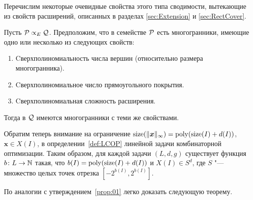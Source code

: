Перечислим некоторые очевидные свойства этого типа сводимости,
вытекающие из свойств расширений, описанных в разделах \ref{sec:Extension} и \ref{sec:RectCover}. 

	
\begin{prop}
	\label{thm:PropE}
	Пусть ${\mathcal P} \propto_E {\mathcal Q}$.
	Предположим, что в семействе ${\mathcal P}$ есть многогранники, имеющие одно или несколько из следующих свойств:
	\begin{enumerate}
		\item Cверхполиномиальность числа вершин (относительно размера многогранника).
		\item Cверхполиномиальное число прямоугольного покрытия.
		\item Cверхполиномиальная сложность расширения.
	\end{enumerate}
	\noindent
	Тогда в ${\mathcal Q}$ имеются многогранники с теми же свойствами.
\end{prop}

Обратим теперь внимание на ограничение $\operatorname{size}(\|\bm{x}\|_{\infty}) = \operatorname{poly}(\operatorname{size}(I) + d(I))$, $\bm{x} \in X(I)$, в определении~\ref{def:LCOP} линейной задачи комбинаторной оптимизации.
Таким образом, для каждой задачи $(L,d,g)$ существует функция $b \colon L \to \mathbb{N}$ такая, что $b(I) = \operatorname{poly}(\operatorname{size}(I) + d(I))$ и $X(I) \in S^d$, где $S$ "--- множество целых точек отрезка $[-2^{b(I)}, 2^{b(I)}]$. 





По аналогии с утверждением~\ref{prop:01} легко доказать следующую теорему.

